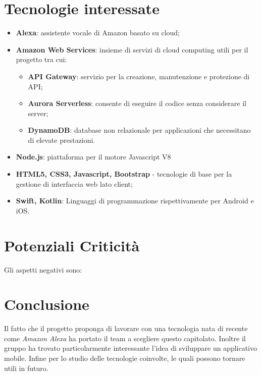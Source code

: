 \section{Tecnologie interessate}
\begin{itemize}
	\item \textbf{Alexa}: assistente vocale di Amazon basato su cloud;
	\item \textbf{Amazon Web Services}: insieme di servizi di cloud computing utili per il progetto tra cui:
	\begin{itemize}
	\item \textbf{API Gateway}: servizio per la creazione, manutenzione e protezione di API;
	\item \textbf{Aurora Serverless}: consente di eseguire il codice senza considerare il server;
	\item \textbf{DynamoDB}: database non relazionale per applicazioni che necessitano di elevate prestazioni.
	\end{itemize}
	\item \textbf{Node.js}: piattaforma per il motore Javascript V8
	\item \textbf{HTML5, CSS3, Javascript, Bootstrap} - tecnologie di base per la gestione di interfaccia web lato client;
	\item \textbf{Swift, Kotlin}: Linguaggi di programmazione rispettivamente per Android e iOS.
\end{itemize}
\section{Potenziali Criticità}
Gli aspetti negativi sono:
\section{Conclusione}
Il fatto che il progetto proponga di lavorare con una tecnologia nata di recente come \emph{Amazon Alexa} ha portato il team a scegliere questo capitolato. Inoltre il gruppo ha trovato particolarmente interessante l'idea di sviluppare un applicativo mobile. Infine per lo studio delle tecnologie coinvolte, le quali possono tornare utili in futuro.